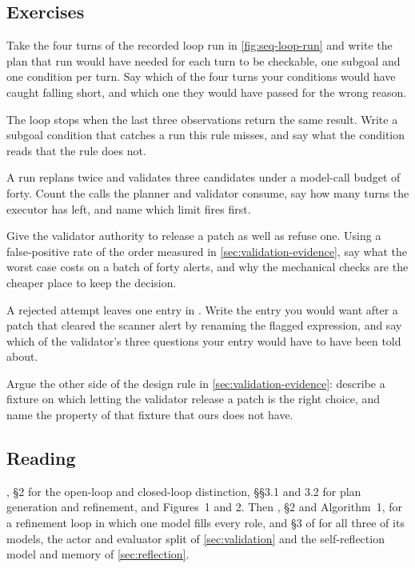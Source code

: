 \subsection{Exercises}

\be

\item Take the four turns of the recorded loop run in \cref{fig:seq-loop-run} and write the plan
that run would have needed for each turn to be checkable, one subgoal and one condition per turn.
Say which of the four turns your conditions would have caught falling short, and which one they
would have passed for the wrong reason.

\item The loop stops when the last three observations return the same result. Write a subgoal
condition that catches a run this rule misses, and say what the condition reads that the rule does
not.

\item A run replans twice and validates three candidates under a model-call budget of forty. Count
the calls the planner and validator consume, say how many turns the executor has left, and name
which limit fires first.

\item Give the validator authority to release a patch as well as refuse one. Using a false-positive
rate of the order measured in \cref{sec:validation-evidence}, say what the worst case costs on a
batch of forty alerts, and why the mechanical checks are the cheaper place to keep the decision.

\item A rejected attempt leaves one entry in . Write the entry you would want
after a patch that cleared the scanner alert by renaming the flagged expression, and say which of
the validator's three questions your entry would have to have been told about.

\item Argue the other side of the design rule in \cref{sec:validation-evidence}: describe a fixture
on which letting the validator release a patch is the right choice, and name the property of that
fixture that ours does not have.

\ee

\subsection{Reading}

\citet{sun2023adaplanner}, \S2 for the open-loop and closed-loop distinction, \S\S3.1
and 3.2 for plan generation and refinement, and Figures~1 and 2. Then
\citet{madaan2023selfrefine}, \S2 and Algorithm~1, for a refinement loop in which one model fills
every role, and \S3 of \citet{shinn2023reflexion} for all three of its models, the actor and
evaluator split of \cref{sec:validation} and the self-reflection model and memory of
\cref{sec:reflection}.

